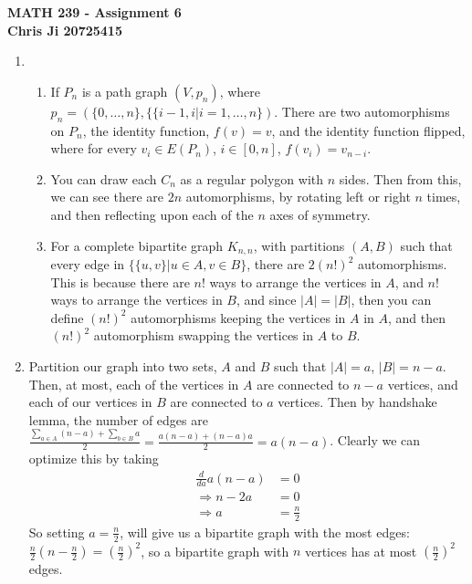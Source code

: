 \documentclass[10pt,english]{article}
\begin{document}
\noindent \begin{center}
\textbf{\large{}MATH 239 - Assignment 6}\\
\textbf{\large{}Chris Ji 20725415}
\par\end{center}{\large \par}
\medskip{}

\begin{enumerate}
\item \begin{enumerate}
    \item If $P_n$ is a path graph $(V,p_n)$, where $p_n=(\{0,\ldots,n\},\{\{i-1,i|i=1,\ldots,n\})$. There are two automorphisms on $P_n$, the identity function, $f(v)=v$, and the identity function flipped, where for every $v_i\in E(P_n)$, $i\in[0,n]$, $f(v_i)=v_{n-i}$.
    
    \item You can draw each $C_n$ as a regular polygon with $n$ sides. Then from this, we can see there are $2n$ automorphisms, by rotating left or right $n$ times, and then reflecting upon each of the $n$ axes of symmetry. 
    
    \item For a complete bipartite graph $K_{n,n}$, with partitions $(A,B)$ such that every edge in $\{\{u,v\}|u\in A,v\in B\}$, there are $2(n!)^2$ automorphisms. This is because there are $n!$ ways to arrange the vertices in $A$, and $n!$ ways to arrange the vertices in $B$, and since $|A|=|B|$, then you can define $(n!)^2$ automorphisms keeping the vertices in $A$ in $A$, and then $(n!)^2$ automorphism swapping the vertices in $A$ to $B$. 
\end{enumerate}

\pagebreak
\item Partition our graph into two sets, $A$ and $B$ such that $|A|=a$, $|B|=n-a$. Then, at most, each of the vertices in $A$ are connected to $n-a$ vertices, and each of our vertices in $B$ are connected to $a$ vertices. Then by handshake lemma, the number of edges are $\frac{\sum_{a\in A}(n-a)+\sum_{b\in B}a}{2}=\frac{a(n-a)+(n-a)a}{2}=a(n-a)$. Clearly we can optimize this by taking \begin{align*}\frac{d}{da}a(n-a)&=0\\\Rightarrow n-2a&=0\\\Rightarrow a&=\frac{n}{2}\end{align*} So setting $a=\frac{n}{2}$, will give us a bipartite graph with the most edges: $\frac{n}{2}(n-\frac{n}{2})=\left(\frac{n}{2}\right)^2$, so a bipartite graph with $n$ vertices has at most $\left(\frac{n}{2}\right)^2$ edges. 


\end{enumerate}
\end{document}
